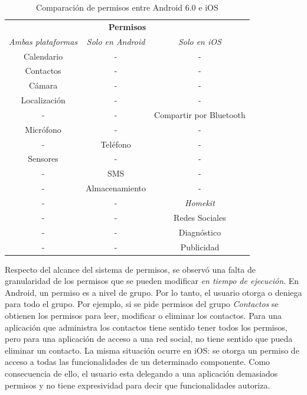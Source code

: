\begin{table}[tbp]
	\center
	\begin{tabular}{c c c}
		\hline
		\multicolumn{3}{c}{\textbf{Permisos}} \\
		\emph{Ambas plataformas} 	& \emph{Solo en Android}	& \emph{Solo en iOS} \\ \hline    \hline
		Calendario	& -		& -	\\						
		Contactos	& -				& - \\						
		Cámara		& -				& -	\\						
		Localización& -				& -	\\						
		-			& -				& Compartir por Bluetooth\\ 
		Micrófono   & -				& - \\						
		-			& Teléfono		& -	\\						
		Sensores    & -    			& - \\						
		-			& SMS			& - \\						
		-			& Almacenamiento& - \\						
		-			& -				& \emph{Homekit} \\			
		-			& -				& Redes Sociales \\        	
		-			& -				& Diagnóstico \\        			
		-			& -				& Publicidad \\    			\hline
	\end{tabular}
	\caption{Comparación de permisos entre Android 6.0 e iOS}
	\label{tab:chapter03:compPerm}
\end{table}
Respecto del alcance del sistema de permisos, se observó una falta de granularidad de los permisos que se pueden modificar \emph{en tiempo de ejecución}. En Android, un permiso es a nivel de grupo. Por lo tanto, el usuario otorga o deniega para todo el grupo. Por ejemplo, si se pide permisos del grupo \emph{Contactos} se obtienen los permisos para leer, modificar o eliminar los contactos. Para  una aplicación que administra los contactos tiene sentido tener todos los permisos, pero para una aplicación de acceso a una red social, no tiene sentido que pueda eliminar un contacto. La misma situación ocurre en iOS: se otorga un permiso de acceso a todas las funcionalidades de un determinado componente. Como consecuencia de ello, el usuario esta delegando a una aplicación demasiados permisos y no tiene expresividad para decir que funcionalidades autoriza.\\

